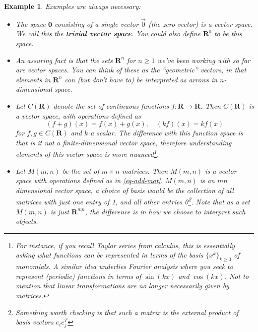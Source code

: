 \documentclass[12pt]{article}
\numberwithin{equation}{subsection}
\numberwithin{figure}{subsection}
\theoremstyle{note}
\newtheorem{example}[subsection]{Example}
\begin{document}
\begin{example} Examples are always necessary: 

\begin{itemize}
\item The space $\mathbf{0}$ consisting of a single vector $\vec{0}$ (the zero vector) is a vector space. We call this the \textbf{trivial vector space}. You could also \textit{define} $\mathbf{R}^0$ to be this space. 

\item An assuring fact is that the sets $\mathbf{R}^n$ for $n\geq 1$ we've been working with so far are vector spaces. You can think of these as the ``geometric'' vectors, in that elements in $\mathbf{R}^n$ \textit{can} (but don't have to) be interpreted as arrows in $n$-dimensional space. 

\item Let $C(\mathbf{R})$ denote the set of continuous functions $f\colon\mathbf{R}\to\mathbf{R}$. Then $C(\mathbf{R})$ is a vector space, with operations defined as \[ (f+g)(x)=f(x)+g(x), \quad (kf)(x)=kf(x)\] for $f,g\in C(\mathbf{R})$ and $k$ a scalar. The difference with this function space is that is it not a finite-dimensional vector space, therefore understanding elements of this vector space is more nuanced\footnote{For instance, if you recall Taylor series from calculus, this is essentially asking what functions can be represented in terms of the basis $\{x^k\}_{k\geq 0}$ of monomials. A similar idea underlies Fourier analysis where you seek to represent (periodic) functions in terms of $\sin(kx)$ and $\cos(kx)$. Not to mention that linear transformations are no longer necessarily given by matrices.}. 

\item Let $M(m,n)$ be the set of $m\times n$ matrices. Then $M(m,n)$ is a vector space with operations defined as in \eqref{eq-add-mat}. $M(m,n)$ is an $mn$ dimensional vector space, a choice of basis would be the collection of all matrices with just one entry of 1, and all other entries 0\footnote{Something worth checking is that such a matrix is the \textit{external product} of basis vectors $e_ie_j^T$}. Note that as a set $M(m,n)$ is just $\mathbf{R}^{mn}$, the difference is in how we choose to interpret such objects. 


\end{itemize}
\end{example}
\end{document}
